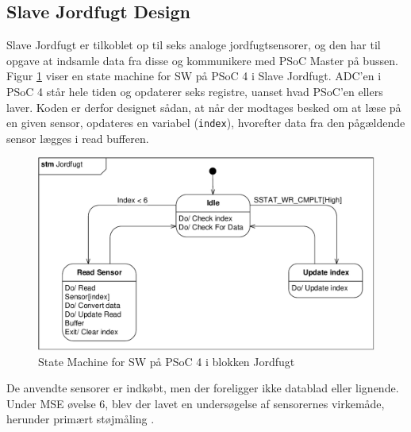 \subsection{Slave Jordfugt Design}
\label{ch:slave_jordfugt_design}

Slave Jordfugt er tilkoblet op til seks analoge jordfugtsensorer, og den har til opgave at indsamle data fra disse og kommunikere med PSoC Master på \IIC bussen.
Figur \ref{fig:stm_jordfugt} viser en state machine for SW på PSoC 4 i Slave Jordfugt. 
ADC'en i PSoC 4 står hele tiden og opdaterer seks registre, uanset hvad PSoC'en ellers laver. 
Koden er derfor designet sådan, at når der modtages besked om at læse på en given sensor, opdateres en variabel (\texttt{index}), hvorefter data fra den pågældende sensor lægges i read bufferen.

\begin{figure}[h]
\centering 
\includegraphics[width={\textwidth}, trim=0 0 0 0, clip=true] {../fig/stm_jordfugt.pdf}
\caption{State Machine for SW på PSoC 4 i blokken Jordfugt}
\label{fig:stm_jordfugt}
\end{figure}

De anvendte sensorer er indkøbt, men der foreligger ikke datablad eller lignende.
Under MSE øvelse 6, blev der lavet en undersøgelse af sensorernes virkemåde, herunder primært støjmåling \cite{lib:MSE_06}.

\clearpage